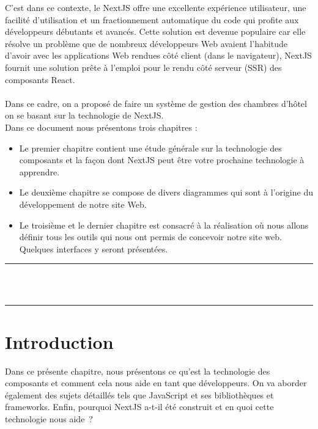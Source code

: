 \documentclass[12pt]{report}
\begin{document}
C’est dans ce contexte, le NextJS offre une excellente expérience utilisateur, une facilité d’utilisation et un fractionnement automatique du code qui profite aux développeurs débutants et avancés. Cette solution est devenue populaire car elle résolve un problème que de nombreux développeurs Web avaient l’habitude d’avoir avec les applications Web rendues côté client (dans le navigateur), NextJS fournit une solution prête à l’emploi pour le rendu côté serveur (SSR) des composants React.
\\\\
\hspace*{0.16in}
Dans ce cadre, on a proposé de faire un système de gestion des chambres d’hôtel on se basant sur la technologie de NextJS.
\\
Dans ce document nous présentons trois chapitres :

\begin{itemize}
    \item Le premier chapitre contient une étude générale sur la technologie des composants et la façon dont NextJS peut être votre prochaine technologie à apprendre.
    \item Le deuxième chapitre se compose de divers diagrammes qui sont à l’origine du développement de notre site Web.
    \item Le troisième et le dernier chapitre est consacré à la réalisation où nous allons définir tous les outils qui nous ont permis de concevoir notre site web. Quelques interfaces y seront présentées.
\end{itemize}

\newpage

\vspace*{\fill}
\begin{center}
    {\color{Black} \rule{\linewidth}{1.2mm} }\\
\vspace{0.25in}
 {\centering{}}
\vspace{0.35in}\\
    {\color{Black} \rule{\linewidth}{1.2mm} }
\end{center}
\vspace*{\fill}
\setcounter{section}{0}

\newpage

\section{Introduction}
\vspace{0.2in}
\hspace*{0.16in}
Dans ce présente chapitre, nous présentons ce qu’est la technologie des composants et comment cela nous aide en tant que développeurs. On va aborder également des sujets détaillés tels que JavaScript et ses bibliothèques et frameworks. Enfin, pourquoi NextJS a-t-il été construit et en quoi cette technologie nous aide ?
\end{document}
